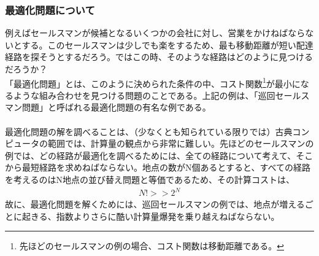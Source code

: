 \documentclass[a4paper,10.5pt]{article}
\numberwithin{equation}{section}
\begin{document}
\subsubsection{最適化問題について}
例えばセールスマンが候補となるいくつかの会社に対し、営業をかけねばならないとする。このセールスマンは少しでも楽をするため、最も移動距離が短い配達経路を探そうとするだろう。ではこの時、そのような経路はどのように見つけるだろうか？\\
「最適化問題」とは、このように決められた条件の中、コスト関数\footnote{先ほどのセールスマンの例の場合、コスト関数は移動距離である。}が最小になるような組み合わせを見つける問題のことである。上記の例は、「巡回セールスマン問題」と呼ばれる最適化問題の有名な例である。\\
\\
最適化問題の解を調べることは、（少なくとも知られている限りでは）古典コンピュータの範囲では、計算量の観点から非常に難しい。先ほどのセールスマンの例では、どの経路が最適化を調べるためには、全ての経路について考えて、そこから最短経路を求めねばならない。地点の数がN個あるとすると、すべての経路を考えるのはN地点の並び替え問題と等価であるため、その計算コストは、
\begin{align*}
    N!>>2^{N}
\end{align*}
故に、最適化問題を解くためには、巡回セールスマンの例では、地点が増えるごとに起きる、指数よりさらに酷い計算量爆発を乗り越えねばならない。\\
\end{document}
